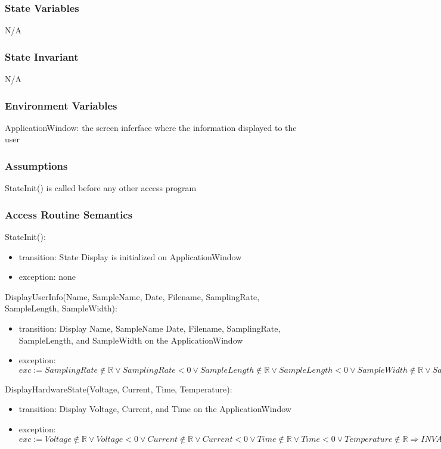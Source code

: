 \documentclass[12pt, titlepage]{article}
\begin{document}
\subsubsection{State Variables}

N/A

\subsubsection{State Invariant}

N/A

\subsubsection{Environment Variables}

ApplicationWindow: the screen inferface where the information displayed to the user

\subsubsection{Assumptions}

StateInit() is called before any other access program

\subsubsection{Access Routine Semantics}

\noindent StateInit():
\begin{itemize}
\item transition: State Display is initialized on ApplicationWindow
\item exception: none
\end{itemize}

\noindent DisplayUserInfo(Name, SampleName, Date, Filename, SamplingRate, SampleLength, SampleWidth):
\begin{itemize}
\item transition: Display Name, SampleName Date, Filename, SamplingRate, SampleLength, and SampleWidth on the ApplicationWindow
\item exception: $exc:= SamplingRate \notin \mathbb{R} \lor SamplingRate < 0 \lor SampleLength \notin \mathbb{R} \lor SampleLength < 0 \lor SampleWidth \notin \mathbb{R} \lor SampleWidth < 0 \Rightarrow INVALID$
\end{itemize}

\noindent DisplayHardwareState(Voltage, Current, Time, Temperature):
\begin{itemize}
\item transition: Display Voltage, Current, and Time on the ApplicationWindow
\item exception: $exc:= Voltage \notin  \mathbb{R} \lor Voltage < 0 \lor  Current \notin  \mathbb{R} \lor Current < 0 \lor  Time \notin  \mathbb{R} \lor Time < 0 \lor  Temperature \notin  \mathbb{R} \Rightarrow INVALID$
\end{itemize}
\end{document}
